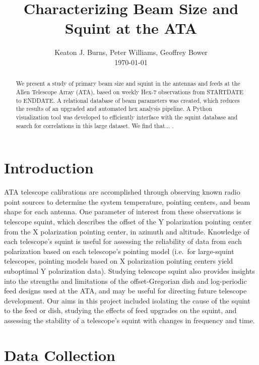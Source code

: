 \documentclass[preprint]{aastex}
\begin{document}
\title{Characterizing Beam Size and Squint at the ATA}
\author{Keaton J. Burns, Peter Williams, Geoffrey Bower \\ \today}

\begin{abstract}
We present a study of primary beam size and squint in the antennas and
feeds at the Allen Telescope Array (ATA), based on weekly Hex-7
observations from STARTDATE to ENDDATE.  A relational database of beam
parameters was created, which reduces the results of an upgraded and
automated hex analysis pipeline.  A Python visualization tool was
developed to efficiently interface with the squint database and search
for correlations in this large dataset.  We find that...  .
\end{abstract}

\tableofcontents


\section{Introduction}\label{s.intro}
ATA telescope calibrations are accomplished through observing known
radio point sources to determine the system temperature, pointing
centers, and beam shape for each antenna.  One parameter of interest
from these observations is telescope squint, which describes the
offset of the Y polarization pointing center from the X polarization
pointing center, in azimuth and altitude.  Knowledge of each
telescope's squint is useful for assessing the reliability of data
from each polarization based on each telescope's pointing model
(i.e.~for large-squint telescopes, pointing models based on X
polarization pointing centers yield suboptimal Y polarization
data). Studying telescope squint also provides insights into the
strengths and limitations of the offset-Gregorian dish and
log-periodic feed designs used at the ATA, and may be useful for
directing future telescope development.  Our aims in this project
included isolating the cause of the squint to the feed or dish,
studying the effects of feed upgrades on the squint, and assessing the
stability of a telescope's squint with changes in frequency and time.


\section{Data Collection}\label{s.datacollection}
\end{document}
